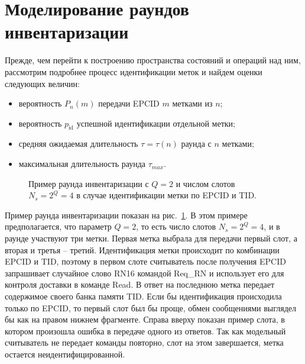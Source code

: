 \section{Моделирование раундов инвентаризации}\label{sec:ch3_inventory}
Прежде, чем перейти к построению пространства состояний и операций над ним, рассмотрим подробнее процесс идентификации меток и найдем оценки следующих величин:

\begin{itemize}
	\item вероятность $P_n(m)$ передачи EPCID $m$ метками из $n$;
	\item вероятность $p_\text{id}$ успешной идентификации отдельной метки;
	\item средняя ожидаемая длительность $\tau = \tau(n)$ раунда с $n$ метками;
	\item максимальная длительность раунда $\tau_{max}$.
\end{itemize}

\begin{figure}[htb]
  \caption[Пример раунда опроса при идентификации по EPCID и TID.]{Пример раунда инвентаризации с $Q=2$ и числом слотов $N_s=2^Q=4$ в случае идентификации метки по EPCID и TID. }
  \label{fig:ch3_inventory_round}
\end{figure}

Пример раунда инвентаризации показан на рис.~\ref{fig:ch3_inventory_round}. В этом примере предполагается, что параметр $Q = 2$, то есть число слотов $N_s = 2^Q = 4$, и в раунде участвуют три метки. Первая метка выбрала для передачи первый слот, а вторая и третья -- третий. Идентификация метки происходит по комбинации EPCID и TID, поэтому в первом слоте считыватель после получения EPCID запрашивает случайное слово RN16 командой Req\_RN и использует его для контроля доставки в команде Read. В ответ на последнюю метка передает содержимое своего банка памяти TID. Если бы идентификация происходила только по EPCID, то первый слот был бы проще, обмен сообщениями выглядел бы как на правом нижнем фрагменте. Справа вверху показан пример слота, в котором произошла ошибка в передаче одного из ответов. Так как модельный считыватель не передает команды повторно, слот на этом завершается, метка остается неидентифицированной.

